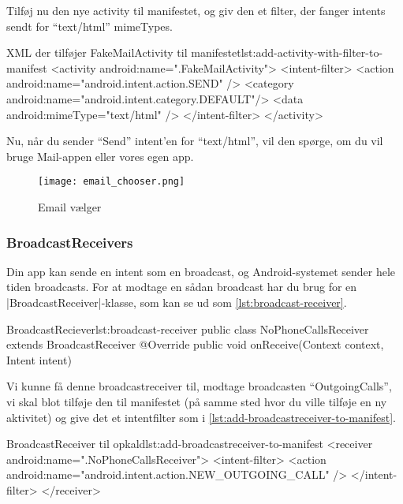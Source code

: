 Tilføj nu den nye activity til manifestet, og giv den et filter, der fanger intents sendt for ``text/html'' mimeTypes.

\begin{XmlCode}{XML der tilføjer FakeMailActivity til manifestet}{lst:add-activity-with-filter-to-manifest}
	<activity android:name=".FakeMailActivity">
		<intent-filter>
			<action android:name="android.intent.action.SEND" />
			<category android:name="android.intent.category.DEFAULT"/>
			<data android:mimeType="text/html" />
		</intent-filter>
	</activity>
\end{XmlCode}

Nu, når du sender ``Send'' intent'en for ``text/html'', vil den spørge, om du vil bruge Mail-appen eller vores egen app.

\begin{figure}[h]
	\begin{center}
		\texttt{[image: email\_chooser.png]}
		\caption{Email vælger}
		\label{fig:android:activities:email_chooser}
	\end{center}
\end{figure}

\subsubsection{BroadcastReceivers}

Din app kan sende en intent som en broadcast, og Android-systemet sender hele tiden broadcasts. For at modtage en sådan broadcast har du brug for en \JavaInline|BroadcastReceiver|-klasse, som kan se ud som \autoref{lst:broadcast-receiver}.

\begin{JavaCode}{BroadcastReciever}{lst:broadcast-receiver}
	public class NoPhoneCallsReceiver extends BroadcastReceiver {
		@Override
		public void onReceive(Context context, Intent intent) {
		}
	}
\end{JavaCode}

Vi kunne få denne broadcastreceiver til, modtage broadcasten ``OutgoingCalls'', vi skal blot tilføje den til manifestet (på samme sted hvor du ville tilføje en ny aktivitet) og give det et intentfilter som i \autoref{lst:add-broadcastreceiver-to-manifest}.

\begin{XmlCode}{BroadcastReceiver til opkald}{lst:add-broadcastreceiver-to-manifest}
	<receiver android:name=".NoPhoneCallsReceiver">
		<intent-filter>
			<action android:name="android.intent.action.NEW_OUTGOING_CALL" />
		</intent-filter>
	</receiver>
\end{XmlCode}

